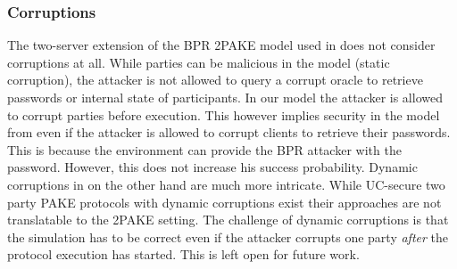 \subsubsection{Corruptions}
The two-server extension of the BPR 2PAKE model used in \cite{KatzMTB05} does not consider corruptions at all.
While parties can be malicious in the model (static corruption), the attacker is not allowed to query a corrupt oracle to retrieve passwords or internal state of participants.
In our model the attacker is allowed to corrupt parties before execution.
This however implies security in the model from \cite{KatzMTB05} even if the attacker is allowed to corrupt clients to retrieve their passwords.
This is because the environment can provide the BPR attacker with the password.
However, this does not increase his success probability.
Dynamic corruptions in \FTWOPAKE on the other hand are much more intricate.
While UC-secure two party PAKE protocols with dynamic corruptions exist their approaches are not translatable to the 2PAKE setting.
The challenge of dynamic corruptions is that the simulation has to be correct even if the attacker corrupts one party \emph{after} the protocol execution has started.
This is left open for future work.
